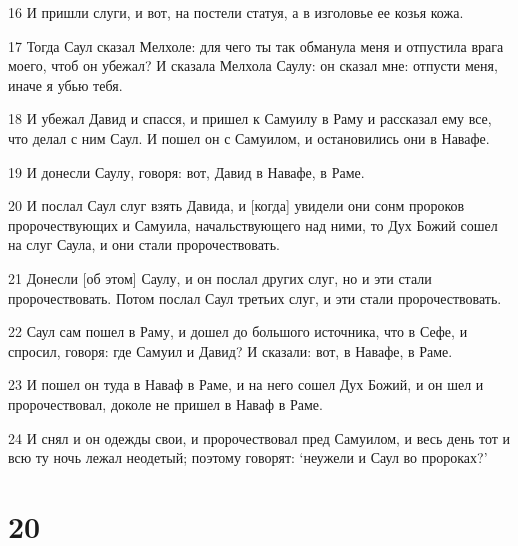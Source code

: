 \par 16 И пришли слуги, и вот, на постели статуя, а в изголовье ее козья кожа.
\par 17 Тогда Саул сказал Мелхоле: для чего ты так обманула меня и отпустила врага моего, чтоб он убежал? И сказала Мелхола Саулу: он сказал мне: отпусти меня, иначе я убью тебя.
\par 18 И убежал Давид и спасся, и пришел к Самуилу в Раму и рассказал ему все, что делал с ним Саул. И пошел он с Самуилом, и остановились они в Навафе.
\par 19 И донесли Саулу, говоря: вот, Давид в Навафе, в Раме.
\par 20 И послал Саул слуг взять Давида, и [когда] увидели они сонм пророков пророчествующих и Самуила, начальствующего над ними, то Дух Божий сошел на слуг Саула, и они стали пророчествовать.
\par 21 Донесли [об этом] Саулу, и он послал других слуг, но и эти стали пророчествовать. Потом послал Саул третьих слуг, и эти стали пророчествовать.
\par 22 Саул сам пошел в Раму, и дошел до большого источника, что в Сефе, и спросил, говоря: где Самуил и Давид? И сказали: вот, в Навафе, в Раме.
\par 23 И пошел он туда в Наваф в Раме, и на него сошел Дух Божий, и он шел и пророчествовал, доколе не пришел в Наваф в Раме.
\par 24 И снял и он одежды свои, и пророчествовал пред Самуилом, и весь день тот и всю ту ночь лежал неодетый; поэтому говорят: `неужели и Саул во пророках?'

\chapter{20}

